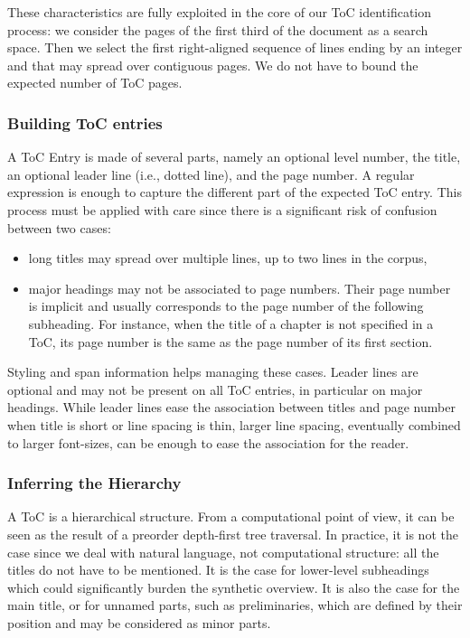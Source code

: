 These characteristics are fully exploited in the core of our ToC identification process: we consider the pages of the first third of the document as a search space. Then we select the first right-aligned sequence of lines ending by an integer and that may spread over contiguous pages. We do not have to bound the expected number of ToC pages.

\subsubsection{Building ToC entries}

A ToC Entry is made of several parts, namely an optional level number, the title, an optional leader line (i.e., dotted line), and the page number. A regular expression is enough to capture the different part of the expected ToC entry. This process must be applied with care since there is a significant risk of confusion between two cases: 
\begin{itemize}
    \item long titles may spread over multiple lines, up to two lines in the corpus,
    \item major headings may not be associated to page numbers. Their page number is implicit and usually corresponds to the page number of the following subheading. For instance, when the title of a chapter is not specified in a ToC, its page number is the same as the page number of its first section.
\end{itemize} 

Styling and span information helps managing these cases. Leader lines are optional and may not be present on all ToC entries, in particular on major headings.  While leader lines ease the association between titles and page number when title is short or line spacing is thin, larger line spacing, eventually combined to larger font-sizes, can be enough to ease the association for the reader.

\subsubsection{Inferring the Hierarchy}

A ToC is a hierarchical structure. From a computational point of view, it can be seen as the result of a preorder depth-first tree traversal. In practice, it is not the case since we deal with natural language, not computational structure: all the titles do not have to be mentioned. It is the case for lower-level subheadings which could significantly burden the synthetic overview. It is also the case for the main title, or for unnamed parts, such as preliminaries, which are defined by their position and may be considered as minor parts.

